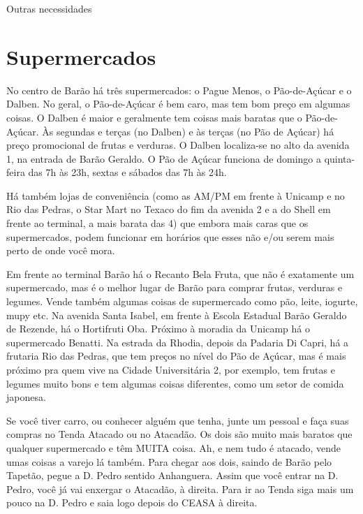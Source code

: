 
\begin{story}{Outras necessidades}

\section*{Supermercados}

No centro de Barão há três supermercados: o Pague Menos, o Pão-de-Açúcar e o Dalben. No geral, o Pão-de-Açúcar é bem caro, mas tem bom preço em algumas coisas. O Dalben é maior e geralmente tem coisas mais baratas que o Pão-de-Açúcar. Às segundas e terças (no Dalben) e às terças (no Pão de Açúcar) há preço promocional de frutas e verduras. O Dalben localiza-se no alto da avenida 1, na entrada de Barão Geraldo. O Pão de Açúcar funciona de domingo a quinta-feira das 7h às 23h, sextas e sábados das 7h às 24h.

Há também lojas de conveniência (como as AM/PM em frente à Unicamp e no Rio das Pedras, o Star Mart no Texaco do fim da avenida 2 e a do Shell em frente ao terminal, a mais barata das 4) que embora mais caras que os supermercados, podem funcionar em horários que esses não e/ou serem mais perto de onde você mora.

Em frente ao terminal Barão há o Recanto Bela Fruta, que não é exatamente um supermercado, mas é o melhor lugar de Barão para comprar frutas, verduras e legumes. Vende também algumas coisas de supermercado como pão, leite, iogurte, mupy etc. Na avenida Santa Isabel, em frente à Escola Estadual Barão Geraldo de Rezende, há o Hortifruti Oba. Próximo à moradia da Unicamp há o supermercado Benatti. Na estrada da Rhodia, depois da Padaria Di Capri, há a frutaria Rio das Pedras, que tem preços no nível do Pão de Açúcar, mas é mais próximo pra quem vive na Cidade Universitária 2, por exemplo, tem frutas e legumes muito bons e tem algumas coisas diferentes, como um setor de comida japonesa.

Se você tiver carro, ou conhecer alguém que tenha, junte um pessoal e faça suas compras no Tenda Atacado ou no Atacadão. Os dois são muito mais baratos que qualquer supermercado e têm MUITA coisa. Ah, e nem tudo é atacado, vende umas coisas a varejo lá também. Para chegar aos dois, saindo de Barão pelo Tapetão, pegue a D. Pedro sentido Anhanguera. Assim que você entrar na D. Pedro, você já vai enxergar o Atacadão, à direita. Para ir ao Tenda siga mais um pouco na D. Pedro e saia logo depois do CEASA à direita.


\end{story}
